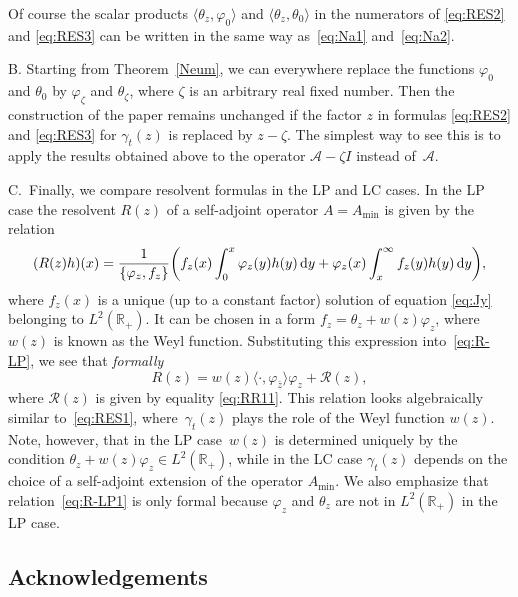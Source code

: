 \documentclass[10pt,a4paper]{amsart}
\numberwithin{equation}{section}
\begin{document}
Of course the scalar products $\langle \theta_z, \varphi_{0}\rangle$ and $\langle \theta_z, \theta_{0}\rangle$ in the numerators of \eqref{eq:RES2} and \eqref{eq:RES3} can be written in the same way as~\eqref{eq:Na1} and~\eqref{eq:Na2}.

 B. Starting from Theorem~\ref{Neum}, we can everywhere replace the functions $\varphi_{0}$ and $\theta_{0}$ by $\varphi_{\zeta}$ and $\theta_{\zeta}$, where $\zeta$ is an arbitrary real fixed number. Then the construction of the paper remains unchanged if the factor $z$ in formulas
 \eqref{eq:RES2} and \eqref{eq:RES3} for $\gamma_{t}(z)$ is replaced by $z-\zeta$. The simplest way to see this is to apply the results obtained above to the operator ${\mathcal A}-\zeta I$ instead of~${\mathcal A}$.

 C.~Finally, we compare resolvent formulas in the LP and LC cases. In the LP case the resolvent $R(z)$ of a self-adjoint operator $A= A_{\min}$ is given by the relation
 \begin{equation}
 ( R (z)h) (x) = \frac{1}{\{\varphi_{z}, f_{z}\}} \bigg(f_{z}(x) \int_{0}^x \varphi_{z}(y) h (y) \,{\rm d}y+
 \varphi_{z}(x) \int_x^\infty f_{z}(y) h (y)\,{\rm d}y\bigg),
 \label{eq:R-LP}\end{equation}
 where $f_{z}(x)$ is a unique (up to a constant factor) solution of equation \eqref{eq:Jy} belonging to $L^2 ({\mathbb R}_{+})$. It can be chosen in a form $f_{z}= \theta_{z}+ w(z) \varphi_{z}$, where $w(z)$ is known as the Weyl function. Substituting this expression into~\eqref{eq:R-LP}, we see that {\it formally}
 \begin{equation}
 R (z) = w(z)\langle\cdot, \varphi_{\bar{z}}\rangle \varphi_{z} + {\mathcal R} (z),
 \label{eq:R-LP1}\end{equation}
 where $ {\mathcal R} (z)$ is given by equality \eqref{eq:RR11}. This relation looks algebraically similar to~\eqref{eq:RES1}, where~$\gamma_{t}(z)$ plays the role of the Weyl function $w(z)$. Note, however, that in the LP case~$w(z)$ is determined uniquely by the condition $ \theta_{z}+ w(z) \varphi_{z} \in L^2 ({\mathbb R}_{+})$, while in the LC case
 $\gamma_{t}(z)$ depends on the choice of a self-adjoint extension of the operator $ A_{\min}$. We also emphasize that relation~\eqref{eq:R-LP1} is only formal because $\varphi_{z}$ and $\theta_{z}$ are not in $L^2 ({\mathbb R}_{+})$
 in the LP case.

 \subsection*{Acknowledgements}
\end{document}
